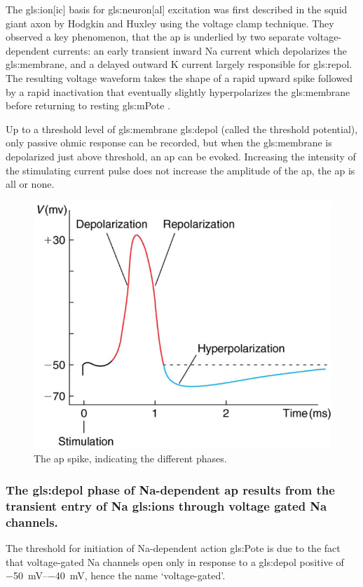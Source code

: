 \documentclass[../../Orator]{subfiles}
\begin{document}
The \gls{gls:ion}[ic] basis for \gls{gls:neuron}[al] excitation was first described in the squid giant axon by Hodgkin and Huxley  using the voltage clamp technique. They observed a key phenomenon, that the \gls{ap} is underlied by two separate voltage-dependent currents: an early transient inward \gls{Na} current which depolarizes the \gls{gls:membrane}, and a delayed outward \gls{K} current largely responsible for \gls{gls:repol}. The resulting voltage waveform takes the shape of a rapid upward spike followed by a rapid inactivation that eventually slightly hyperpolarizes the \gls{gls:membrane} before returning to resting \gls{gls:mPote} .

Up to a threshold level of \gls{gls:membrane} \gls{gls:depol} (called the threshold potential), only passive ohmic response can be recorded, but when the \gls{gls:membrane} is depolarized just above threshold, an \gls{ap} can be evoked.  Increasing the intensity of the stimulating current pulse does not increase the amplitude of the \gls{ap},  the \gls{ap} is all or none. 
\begin{figure}[H]
    \centering
    \includegraphics[width=0.5\linewidth]{Pictures//Anakin/AP.png}
    \caption{The \gls{ap} spike, indicating the different phases.}
    \label{fig:AP}
\end{figure}

\subsubsection{The \gls{gls:depol} phase of \gls{Na}-dependent \gls{ap} results from the transient entry of \gls{Na} \glspl{gls:ion} through voltage gated \gls{Na} channels.}
The threshold  for initiation of \gls{Na}-dependent  action  \gls{gls:Pote} is due to the fact that voltage-gated \gls{Na} channels open only  in  response  to  a  \gls{gls:depol}  positive  of \qtyrange{-50}{-40}{\mV}, hence the name `voltage-gated'. 
\end{document}
